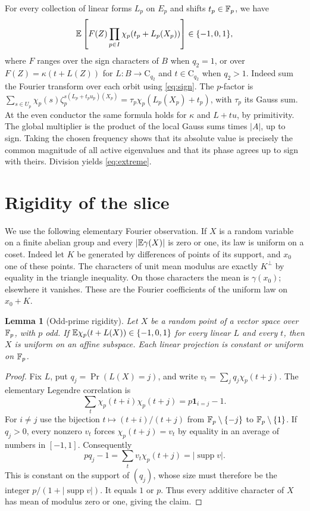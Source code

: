 \documentclass[11pt,letterpaper]{article}
\newtheorem{lemma}[theorem]{Lemma}
\newcommand{\supp}{\operatorname{supp}}\newcommand{\ord}{\operatorname{ord}}
\newcommand{\Cyc}{\mathrm C}
\newcommand{\one}{\mathbf 1}
\newcommand{\z}{\zeta}
\begin{document}
For every collection of linear forms $L_p$ on $E_p$ and shifts $t_p\in\mathbb F_p$, we have
\begin{equation}\label{eq:extreme}
 \mathbb E\left[F(Z)\prod_{p\in I}\chi_p(t_p+L_p(X_p))\right]\in\{-1,0,1\},
\end{equation}
where $F$ ranges over the sign characters of $B$ when $q_2=1$, or over
$F(Z)=\kappa(t+L(Z))$ for $L:B\to\Cyc_{q_2}$ and $t\in\Cyc_{q_2}$ when $q_2>1$.
Indeed sum the Fourier transform over each orbit using \eqref{eq:sign}. The $p$-factor is
$\sum_{s\in U_p}\chi_p(s)\z_p^{s(L_p+t_pu_p)(X_p)}
 =\tau_p\chi_p(L_p(X_p)+t_p)$, with $\tau_p$ its Gauss sum. At the even conductor the same formula holds for $\kappa$ and $L+tu$, by primitivity. The global multiplier is the product of the local Gauss sums times $|A|$, up to sign. Taking the chosen frequency shows that its absolute value is precisely the common magnitude of all active eigenvalues and that its phase agrees up to sign with theirs. Division yields \eqref{eq:extreme}.

\section{Rigidity of the slice}
We use the following elementary Fourier observation. If $X$ is a random variable on a finite abelian group and every $|\mathbb E\gamma(X)|$ is zero or one, its law is uniform on a coset. Indeed let $K$ be generated by differences of points of its support, and $x_0$ one of these points. The characters of unit mean modulus are exactly $K^\perp$ by equality in the triangle inequality. On those characters the mean is $\gamma(x_0)$; elsewhere it vanishes. These are the Fourier coefficients of the uniform law on $x_0+K$.

\begin{lemma}[Odd-prime rigidity]\label{lem:odd}
Let $X$ be a random point of a vector space over $\mathbb F_p$, with $p$ odd. If $\mathbb E\chi_p(t+L(X))\in\{-1,0,1\}$ for every linear $L$ and every $t$, then $X$ is uniform on an affine subspace. Each linear projection is constant or uniform on $\mathbb F_p$.
\end{lemma}
\begin{proof}
Fix $L$, put $q_j=\Pr(L(X)=j)$, and write $v_t=\sum_j q_j\chi_p(t+j)$. The elementary Legendre correlation is
\[
 \sum_t\chi_p(t+i)\chi_p(t+j)=p\one_{i=j}-1.
\]
For $i\ne j$ use the bijection $t\mapsto(t+i)/(t+j)$ from $\mathbb F_p\setminus\{-j\}$ to $\mathbb F_p\setminus\{1\}$. If $q_j>0$, every nonzero $v_t$ forces $\chi_p(t+j)=v_t$ by equality in an average of numbers in $[-1,1]$. Consequently
\[
 p q_j-1=\sum_t v_t\chi_p(t+j)=|\supp v|.
\]
This is constant on the support of $(q_j)$, whose size must therefore be the integer $p/(1+|\supp v|)$. It equals $1$ or $p$. Thus every additive character of $X$ has mean of modulus zero or one, giving the claim.
\end{proof}
\end{document}
